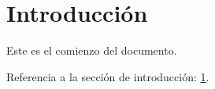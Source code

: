 \documentclass{article}
\begin{document}
\section{Introducción}
\label{sec:intro}
Este es el comienzo del documento.

Referencia a la sección de introducción: \ref{sec:intro}.
\end{document}
